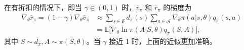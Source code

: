 \begin{theorem}
\label{thm:rl-pg-9-3}
在有折扣的情况下，即当 $\gamma \in (0,1)$ 时，$\bar{v}_{\pi}$ 和 $\bar{r}_{\pi}$ 的梯度为
\begin{equation}
\begin{aligned}
\nabla_{\theta} \bar{r}_{\pi} = (1 - \gamma) \nabla_{\theta} \bar{v}_{\pi} &\approx \sum_{s \in \mathcal{S}} d_{\pi}(s) \sum_{a \in \mathcal{A}} \nabla_{\theta} \pi(a|s,\theta) q_{\pi}(s,a) \\
&= \mathbb{E}\big[ \nabla_{\theta} \ln \pi(A|S,\theta) q_{\pi}(S,A) \big],
\end{aligned}
\end{equation}
其中 $S\sim d_{\pi}, A\sim \pi(S,\theta)$。当 $\gamma$ 接近 1 时，上面的近似更加准确。
\end{theorem}

